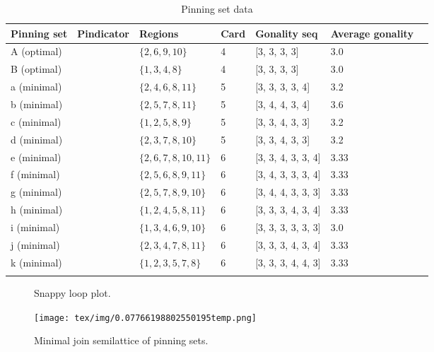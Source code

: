 \documentclass{article}%
\begin{document}
\begin{table}[ht]
	\caption{Pinning set data}
	\centering
	\renewcommand{\arraystretch}{1.5}
	\begin{tabularx}{\textwidth}{lXXXXXX}
		\toprule
			Pinning set & Pindicator & Regions & Card & Gonality seq & Average gonality\\
			\hline
			A (optimal) & {\Huge\textcolor{red0}{\textbullet}} & $\{2,6,9,10\}$ & 4 & [3, 3, 3, 3] & 3.0 \\
			B (optimal) & {\Huge\textcolor{red5}{\textbullet}} & $\{1,3,4,8\}$ & 4 & [3, 3, 3, 3] & 3.0 \\
			a (minimal) & {\Huge\textcolor{green0}{\textbullet}} & $\{2,4,6,8,11\}$ & 5 & [3, 3, 3, 3, 4] & 3.2 \\
			b (minimal) & {\Huge\textcolor{green1}{\textbullet}} & $\{2,5,7,8,11\}$ & 5 & [3, 4, 4, 3, 4] & 3.6 \\
			c (minimal) & {\Huge\textcolor{green2}{\textbullet}} & $\{1,2,5,8,9\}$ & 5 & [3, 3, 4, 3, 3] & 3.2 \\
			d (minimal) & {\Huge\textcolor{green3}{\textbullet}} & $\{2,3,7,8,10\}$ & 5 & [3, 3, 4, 3, 3] & 3.2 \\
			e (minimal) & {\Huge\textcolor{green4}{\textbullet}} & $\{2,6,7,8,10,11\}$ & 6 & [3, 3, 4, 3, 3, 4] & 3.33 \\
			f (minimal) & {\Huge\textcolor{green5}{\textbullet}} & $\{2,5,6,8,9,11\}$ & 6 & [3, 4, 3, 3, 3, 4] & 3.33 \\
			g (minimal) & {\Huge\textcolor{green6}{\textbullet}} & $\{2,5,7,8,9,10\}$ & 6 & [3, 4, 4, 3, 3, 3] & 3.33 \\
			h (minimal) & {\Huge\textcolor{green7}{\textbullet}} & $\{1,2,4,5,8,11\}$ & 6 & [3, 3, 3, 4, 3, 4] & 3.33 \\
			i (minimal) & {\Huge\textcolor{green8}{\textbullet}} & $\{1,3,4,6,9,10\}$ & 6 & [3, 3, 3, 3, 3, 3] & 3.0 \\
			j (minimal) & {\Huge\textcolor{green9}{\textbullet}} & $\{2,3,4,7,8,11\}$ & 6 & [3, 3, 3, 4, 3, 4] & 3.33 \\
			k (minimal) & {\Huge\textcolor{green10}{\textbullet}} & $\{1,2,3,5,7,8\}$ & 6 & [3, 3, 3, 4, 4, 3] & 3.33 \\
		\bottomrule \\ 
	\end{tabularx}
\end{table}

\newpage

\begin{multicols}{2}
\begin{figure}[H]
\centering

\caption{Snappy loop plot.}
\label{fig:tex/img/0.8358571447039065temp.svg}
\end{figure}
\columnbreak

\begin{figure}[H]
\centering
\texttt{[image: tex/img/0.07766198802550195temp.png]}
\caption{Minimal join semilattice of pinning sets.}
\label{fig:tex/img/0.07766198802550195temp.png}
\end{figure}
\end{multicols}
\end{document}
